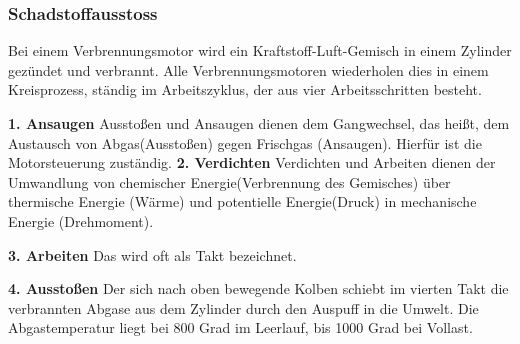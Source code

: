 \subsubsection{Schadstoffausstoss}
\label{subsec:schadstoffausstoss}

Bei einem Verbrennungsmotor wird ein Kraftstoff-Luft-Gemisch in einem Zylinder gezündet und verbrannt.
Alle Verbrennungsmotoren wiederholen dies in einem Kreisprozess, ständig im Arbeitszyklus, der aus vier Arbeitsschritten besteht.

\textbf{1. Ansaugen\newline}
Ausstoßen und Ansaugen dienen dem Gangwechsel, das heißt, dem Austausch von Abgas(Ausstoßen) gegen Frischgas (Ansaugen). Hierfür ist die Motorsteuerung zuständig.
\textbf{2. Verdichten\newline}
Verdichten und Arbeiten dienen der Umwandlung von chemischer Energie(Verbrennung des Gemisches) über thermische Energie (Wärme) und potentielle Energie(Druck) in mechanische Energie (Drehmoment).

\textbf{3. Arbeiten\newline}
Das wird oft als Takt bezeichnet.

\textbf{4. Ausstoßen \newline}
Der sich nach oben bewegende Kolben schiebt im vierten Takt die verbrannten Abgase aus dem Zylinder durch den Auspuff in die Umwelt. 
Die Abgastemperatur liegt bei 800 Grad im Leerlauf, bis 1000 Grad bei Vollast. 
\newline 


\clearpage %